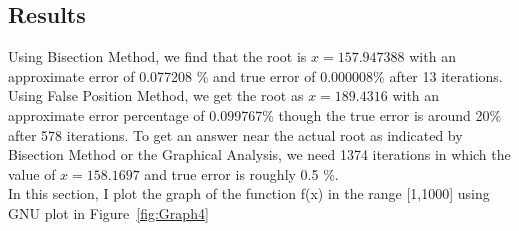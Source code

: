 \documentclass[titlepage, 11pt]{article}
\begin{document}
\subsection{Results}

Using Bisection Method, we find that the root is $x=157.947388$ with an approximate error of 0.077208 \% and true error of 0.000008\% after 13 iterations.\\

Using False Position Method, we get the root as  $x=189.4316$ with an approximate error percentage of 0.099767\% though the true error is around 20\% after 578 iterations. To get an answer near the actual root as indicated by Bisection Method or the Graphical Analysis, we need 1374 iterations in which the value of $x=158.1697$ and true error is roughly 0.5 \%. \\

In this section, I plot the graph of the function f(x) in the range [1,1000] using GNU plot in Figure~\ref{fig:Graph4} \\
\end{document}
